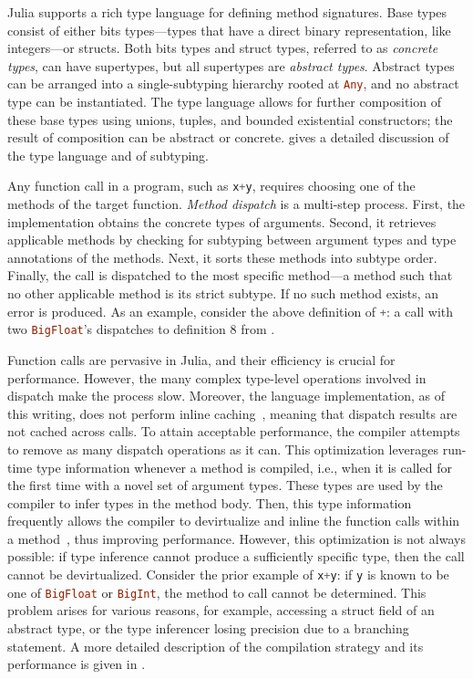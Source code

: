 \documentclass[oneside,openright,titlepage,numbers=noenddot,%
headinclude,footinclude,cleardoublepage=empty,abstract=on,
BCOR=5mm,paper=a4,fontsize=11pt,
dvipsnames
]{scrreprt}
\renewcommand{\c}[1]{\lstinline[language=Julia]!#1!\xspace}
\begin{document}
Julia supports a rich type language for defining method
signatures. Base types consist of either bits types---types that have a direct
binary representation, like integers---or structs. Both bits types and struct
types, referred to as \emph{concrete types}, can have supertypes, but all
supertypes are \emph{abstract types}. Abstract types can be arranged into a
single-subtyping hierarchy rooted at \c{Any}, and no abstract type can be
instantiated. The type language allows for further composition of these base
types using unions, tuples, and bounded existential constructors; the result of
composition can be abstract or concrete. \citet{oopsla18b} gives a detailed
discussion of the type language and of subtyping.

Any function call in a program, such as \c{x+y}, requires choosing one of the
methods of the target function. \emph{Method dispatch} is a multi-step process.
First, the implementation obtains the concrete types of arguments. Second, it
retrieves applicable methods by checking for subtyping between argument types
and type annotations of the methods. Next, it sorts these methods into subtype
order. Finally, the call is dispatched to the most specific method---a method
such that no other applicable method is its strict subtype. If no such
method exists, an error is produced. As an example, consider the above
definition of \c{+}: a call with two \c{BigFloat}'s dispatches to
definition 8 from .

Function calls are pervasive in Julia, and their efficiency is crucial for
performance. However, the many complex type-level operations involved in dispatch
make the process slow. Moreover, the language implementation, as of this writing,
does not perform inline caching~\cite{DS84}, meaning that dispatch results are
not cached across calls. To attain acceptable performance, the compiler attempts
to remove as many dispatch operations as it can. This optimization leverages
run-time type information whenever a method is compiled, i.e., when it is called
for the first time with a novel set of argument types.  These types are used by
the compiler to infer types in the method body. Then, this type information
frequently allows the compiler to devirtualize and inline the function calls
within a method~\cite{aigner}, thus improving performance. However, this
optimization is not always possible: if type inference cannot produce a
sufficiently specific type, then the call cannot be devirtualized. Consider the
prior example of \c{x+y}: if \c{y} is known to be one of \c{BigFloat} or
\c{BigInt}, the method to call cannot be determined. This problem arises for
various reasons, for example, accessing a struct field of an abstract type, or
the type inferencer losing precision due to a branching statement. A more
detailed description of the compilation strategy and its performance is given in
\cite{oopsla18a}.
\end{document}
